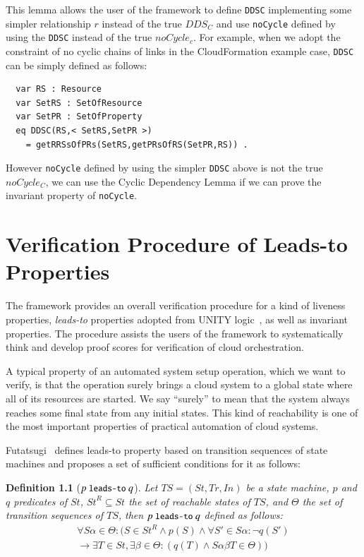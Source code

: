 \documentclass[12pt]{report}
\newtheorem{definition}{Definition}
\newcommand{\ra}{\rightarrow}
\newcommand{\mbstt}[1]{\mbox{\small{\tt {#1}}}}
\newcommand{\ul}{\underline}
\begin{document}
This lemma allows the user of the framework to define {\tt DDSC}
implementing some simpler relationship $r$ instead of the true $\mathit{DDS_C}$
and use {\tt noCycle} defined by using the {\tt DDSC} instead of the true
$noCycle_c$. For example, when we adopt the constraint of no cyclic
chains of links in the CloudFormation example case, {\tt DDSC} can be
simply defined as follows:
\small
\begin{verbatim}
  var RS : Resource
  var SetRS : SetOfResource
  var SetPR : SetOfProperty
  eq DDSC(RS,< SetRS,SetPR >)
    = getRRSsOfPRs(SetRS,getPRsOfRS(SetPR,RS)) .
\end{verbatim}
\normalsize
However {\tt noCycle} defined by using the simpler {\tt DDSC} above is
 not the true $noCycle_C$, we can use the Cyclic Dependency Lemma if
 we can prove the invariant property of {\tt noCycle}.

\chapter{Verification Procedure of Leads-to Properties}
\label{chap:verification}
The framework provides an overall verification procedure for a kind of
liveness properties, {\it leads-to} properties adopted from UNITY
logic~\cite{DBLP:books/daglib/0067338}, as well as invariant
properties.  The procedure assists the users of the framework to
systematically think and develop proof scores for verification of
cloud orchestration.

A typical property of an automated system setup operation, which we
want to verify, is that the operation surely brings a cloud system to
a global state where all of its resources are started.  We say ``surely''
to mean that the system always reaches some final state from any
initial states. This kind of reachability is one of the most important
properties of practical automation of cloud systems.

Futatsugi~\cite{Futatsugi15} defines leads-to property based on
transition sequences of state machines and proposes a set
of sufficient conditions for it as follows:
\begin{definition}[$p~\mbstt{leads-to}~q$]
\label{def:leadsto}
  Let $TS=(\mathit{St},\mathit{Tr},In)$ be a state machine, $p$ and $q$ predicates of
  $\mathit{St}$, $\mathit{St}^R\subseteq \mathit{St}$ the set of reachable states of $TS$, and
  $\Theta$ the set of transition sequences of $TS$, then
  \ul{$p~\mbstt{leads-to}~q$} defined as follows:
  \begin{eqnarray*}
  \forall S\alpha\in \Theta: (S\in \mathit{St}^R \land p(S) \land
  \forall S'\in S\alpha: \neg q(S')\\
  \ra \exists T\in \mathit{St}, \exists\beta\in\Theta:(q(T) \land S\alpha\beta T\in \Theta))
  \end{eqnarray*}
\end{definition}
\end{document}
